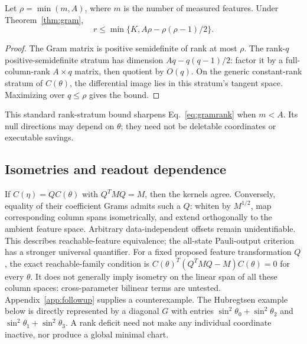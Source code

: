 \begin{corollary}\label{cor:readoutbound}
Let $\rho=\min(m,A)$, where $m$ is the number of measured features.
Under Theorem~\ref{thm:gram},
\begin{equation}
 r\le\min\{K,A\rho-\rho(\rho-1)/2\}.
\end{equation}
\end{corollary}
\begin{proof}
The Gram matrix is positive semidefinite of rank at most $\rho$.
The rank-$q$ positive-semidefinite stratum has dimension
$Aq-q(q-1)/2$: factor it by a full-column-rank $A\times q$ matrix,
then quotient by $O(q)$. On the generic constant-rank stratum of
$C(\theta)$, the differential image lies in this stratum's tangent
space. Maximizing over $q\le\rho$ gives the bound.
\end{proof}
This standard rank-stratum bound sharpens Eq.~\eqref{eq:gramrank}
when $m<A$. Its null directions may depend on $\theta$; they need
not be deletable coordinates or executable savings.

\subsection{Isometries and readout dependence}
If $C(\eta)=Q C(\theta)$ with $Q^TMQ=M$, then the kernels agree.
Conversely, equality of their coefficient Grams admits such a $Q$:
whiten by $M^{1/2}$, map corresponding column spans isometrically,
and extend orthogonally to the ambient feature space. Arbitrary
data-independent offsets remain unidentifiable. This describes
reachable-feature equivalence; the all-state Pauli-output
criterion has a stronger universal quantifier.
For a fixed proposed feature transformation $Q$, the exact
reachable-family condition is
$C(\theta)^T(Q^TMQ-M)C(\theta)=0$ for every $\theta$.
It does not generally imply isometry on the linear span of all
these column spaces: cross-parameter bilinear terms are untested.
Appendix~\ref{app:followup} supplies a counterexample.
The Hubregtsen example below is directly represented by a diagonal
$G$ with entries $\sin^2\theta_0+\sin^2\theta_2$ and
$\sin^2\theta_1+\sin^2\theta_3$. A rank deficit need not make any
individual coordinate inactive, nor produce a global minimal chart.


